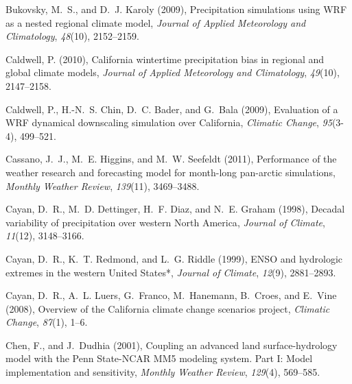 \documentclass[ms,draft]{agutex}   %
\begin{document}
\begin{article}
\begin{thebibliography}{84}
Bukovsky, M.~S., and D.~J. Karoly (2009), {Precipitation simulations using WRF
  as a nested regional climate model}, \textit{Journal of Applied Meteorology
  and Climatology}, \textit{48}(10), 2152--2159.

Caldwell, P. (2010), California wintertime precipitation bias in regional and
  global climate models, \textit{Journal of Applied Meteorology and
  Climatology}, \textit{49}(10), 2147--2158.

Caldwell, P., H.-N.~S. Chin, D.~C. Bader, and G.~Bala (2009), {Evaluation of a
  WRF dynamical downscaling simulation over California}, \textit{Climatic
  Change}, \textit{95}(3-4), 499--521.

Cassano, J.~J., M.~E. Higgins, and M.~W. Seefeldt (2011), Performance of the
  weather research and forecasting model for month-long pan-arctic simulations,
  \textit{Monthly Weather Review}, \textit{139}(11), 3469--3488.

Cayan, D.~R., M.~D. Dettinger, H.~F. Diaz, and N.~E. Graham (1998), {Decadal
  variability of precipitation over western North America}, \textit{Journal of
  Climate}, \textit{11}(12), 3148--3166.

Cayan, D.~R., K.~T. Redmond, and L.~G. Riddle (1999), {ENSO and hydrologic
  extremes in the western United States*}, \textit{Journal of Climate},
  \textit{12}(9), 2881--2893.

Cayan, D.~R., A.~L. Luers, G.~Franco, M.~Hanemann, B.~Croes, and E.~Vine
  (2008), {Overview of the California climate change scenarios project},
  \textit{Climatic Change}, \textit{87}(1), 1--6.

Chen, F., and J.~Dudhia (2001), {Coupling an advanced land surface-hydrology
  model with the Penn State-NCAR MM5 modeling system. Part I: Model
  implementation and sensitivity}, \textit{Monthly Weather Review},
  \textit{129}(4), 569--585.


\end{thebibliography}
\end{article}
\end{document}
